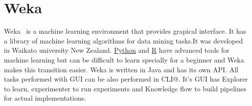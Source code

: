 \section{Weka}

Weka~\cite{hid-sp18-413-weka} is a machine learning environment that provides
grapical interface. It has a library of machine learning algorithms for data
mining tasks.It was developed in Waikato university New
Zealand. \href{https://en.wikipedia.org/wiki/Python_(programming_language)}{Python}
and \href{https://en.wikipedia.org/wiki/R_(programming_language)}{R} have
advanced tools for machine learning but can be difficult to learn specially for
a beginner and Weka makes this transition easier. Weka is written in Java and has
its own API\@. All tasks performed with GUI can be also performed in CLI@\@. It's GUI
has Explorer to learn, experimenter to run experiments and Knowledge flow to
build pipelines for actual implementations.
